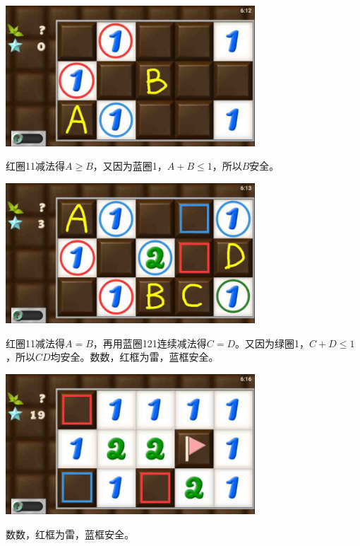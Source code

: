 \subsection{} %
\begin{center}
    \includegraphics[width=0.7\textwidth]{puzzlelow/104-1.jpg}
\end{center}
红圈11减法得$A\ge B$，又因为蓝圈1，$A+B\le 1$，所以$B$安全。
\begin{center}
    \includegraphics[width=0.7\textwidth]{puzzlelow/104-2.jpg}
\end{center}
红圈11减法得$A=B$，再用蓝圈121连续减法得$C=D$。又因为绿圈1，$C+D\le 1$，所以$CD$均安全。数数，红框为雷，蓝框安全。
\begin{center}
    \includegraphics[width=0.7\textwidth]{puzzlelow/104-3.jpg}
\end{center}
数数，红框为雷，蓝框安全。


